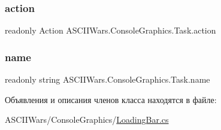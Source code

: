 \subsubsection{\texorpdfstring{action}{action}}
{\footnotesize\ttfamily readonly Action A\+S\+C\+I\+I\+Wars.\+Console\+Graphics.\+Task.\+action}

\hypertarget{class_a_s_c_i_i_wars_1_1_console_graphics_1_1_task_a28591edbf75d92dcf956ce1c69a1e9ab}{}\label{class_a_s_c_i_i_wars_1_1_console_graphics_1_1_task_a28591edbf75d92dcf956ce1c69a1e9ab} 
\subsubsection{\texorpdfstring{name}{name}}
{\footnotesize\ttfamily readonly string A\+S\+C\+I\+I\+Wars.\+Console\+Graphics.\+Task.\+name}



Объявления и описания членов класса находятся в файле\+:\begin{DoxyCompactItemize}
\item 
A\+S\+C\+I\+I\+Wars/\+Console\+Graphics/\hyperlink{_loading_bar_8cs}{Loading\+Bar.\+cs}\end{DoxyCompactItemize}
